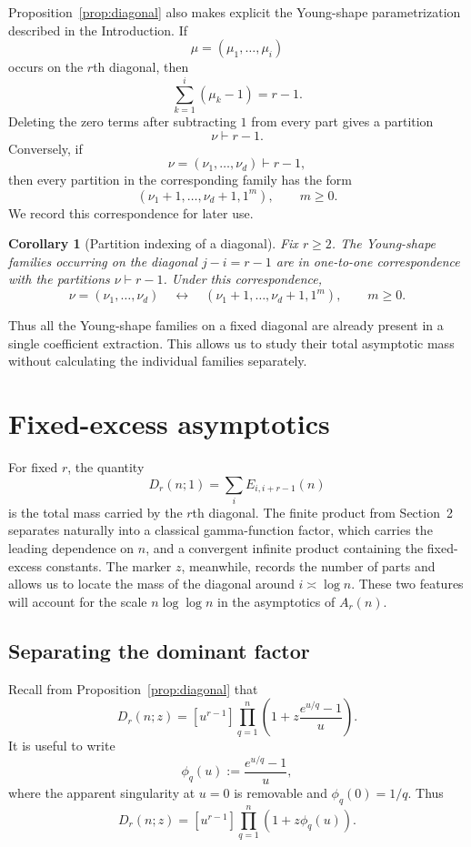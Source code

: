 \documentclass[11pt]{article}
\newtheorem{corollary}[theorem]{Corollary}
\theoremstyle{definition}
\begin{document}
Proposition~\ref{prop:diagonal} also makes explicit the
Young-shape parametrization described in the Introduction.  If
\[
        \mu=(\mu_1,\ldots,\mu_i)
\]
occurs on the $r$th diagonal, then
\[
        \sum_{k=1}^i(\mu_k-1)=r-1.
\]
Deleting the zero terms after subtracting $1$ from every part gives
a partition
\[
        \nu\vdash r-1.
\]
Conversely, if
\[
        \nu=(\nu_1,\ldots,\nu_d)\vdash r-1,
\]
then every partition in the corresponding family has the form
\[
        (\nu_1+1,\ldots,\nu_d+1,1^m),
        \qquad m\geq0.
\]
We record this correspondence for later use.

\begin{corollary}[Partition indexing of a diagonal]
\label{cor:shape}
Fix $r\geq2$.  The Young-shape families occurring on the diagonal
$j-i=r-1$ are in one-to-one correspondence with the partitions
$\nu\vdash r-1$.  Under this correspondence,
\[
        \nu=(\nu_1,\ldots,\nu_d)
        \quad\longleftrightarrow\quad
        (\nu_1+1,\ldots,\nu_d+1,1^m),
        \qquad m\geq0.
\]
\end{corollary}

Thus all the Young-shape families on a fixed diagonal are already
present in a single coefficient extraction.  This allows us to study
their total asymptotic mass without calculating the individual
families separately.

\section{Fixed-excess asymptotics}
\label{sec:asymptotics}

For fixed $r$, the quantity
\[
        D_r(n;1)=\sum_i E_{i,i+r-1}(n)
\]
is the total mass carried by the $r$th diagonal.  The finite product
from Section~2 separates naturally into a classical gamma-function
factor, which carries the leading dependence on $n$, and a convergent
infinite product containing the fixed-excess constants.  The marker
$z$, meanwhile, records the number of parts and allows us to locate
the mass of the diagonal around $i\asymp\log n$.  These two features
will account for the scale $n\log\log n$ in the asymptotics of
$A_r(n)$.


\subsection{Separating the dominant factor}

Recall from Proposition~\ref{prop:diagonal} that
\[
 D_r(n;z)
 =
 [u^{r-1}]
 \prod_{q=1}^n
 \left(
 1+z\frac{e^{u/q}-1}{u}
 \right).
\]
It is useful to write
\[
        \phi_q(u):=\frac{e^{u/q}-1}{u},
\]
where the apparent singularity at $u=0$ is removable and
$\phi_q(0)=1/q$.  Thus
\[
 D_r(n;z)
 =
 [u^{r-1}]
 \prod_{q=1}^n(1+z\phi_q(u)).
\]
\end{document}
